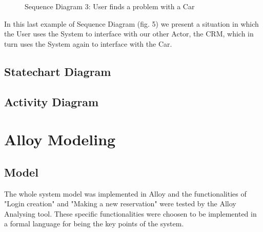 \documentclass[a4paper]{article}
\begin{document}
\begin{figure}[h]
\centering
\vspace*{\fill}
\noindent{}%
\caption {Sequence Diagram 3: User finds a problem with a Car}
\vspace*{0.5cm}
\end{figure}
In this last example of Sequence Diagram (fig. 5) we present a situation in which the User uses the System to interface with our other Actor, the CRM, which in turn uses the System again to interface with the Car.
\newpage

\subsection{Statechart Diagram}
\subsection{Activity Diagram}
\newpage

\section{Alloy Modeling}
\subsection{Model}
The whole system model was implemented in Alloy and the functionalities of  "Login creation" and "Making a new reservation" were tested by the Alloy Analysing tool. These specific functionalities were choosen to be implemented in a formal language for being the key points of the system. 
\end{document}
